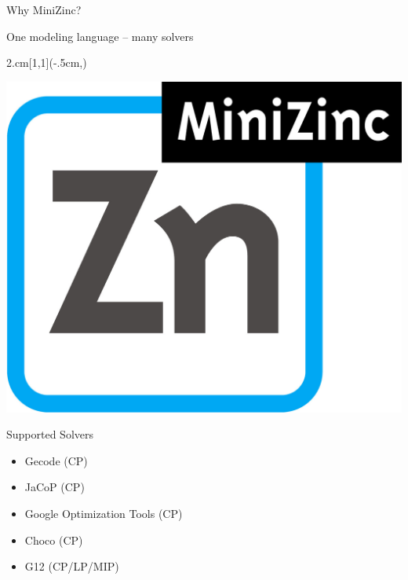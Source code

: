 \documentclass[handout,10pt,xcolor={dvipsnames},fleqn]{beamer}
\begin{document}
\begin{frame}{Why MiniZinc?}
\begin{parchment}[Rationale]
\centering 
\alert{One modeling language -- many solvers} 
\end{parchment}
\begin{textblock*}{2.cm}[1,1](\textwidth-.5cm,\textheight-1.03cm)

\includegraphics[width=\textwidth]{img/MiniZn_logo.jpg} 

\end{textblock*}
Supported Solvers
\begin{itemize}
\item Gecode (CP)
\item JaCoP (CP)
\item Google Optimization Tools (CP)
\item Choco (CP)
\item G12 (CP/LP/MIP)
\end{itemize}

\end{frame}

%
%
%
%
%
%
%
\end{document}
